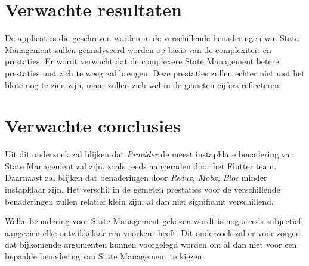 %

\section{Verwachte resultaten}
\label{sec:verwachte_resultaten}

De applicaties die geschreven worden in de verschillende benaderingen van State Management zullen
geanalyseerd worden op basis van de complexiteit en prestaties.
Er wordt verwacht dat de complexere State Management betere prestaties met zich te weeg zal brengen.
Deze prestaties zullen echter niet met het blote oog te zien zijn, maar zullen zich wel in de 
gemeten cijfers reflecteren.


\section{Verwachte conclusies}
\label{sec:verwachte_conclusies}
Uit dit onderzoek zal blijken dat \emph{Provider} de meest instapklare benadering van State Management
zal zijn, zoals reeds aangeraden door het Flutter team.
Daarnaast zal blijken dat benaderingen door \emph{Redux, Mobx, Bloc} minder instapklaar zijn.
Het verschil in de gemeten prestaties voor de verschillende benaderingen zullen relatief klein zijn, al dan niet significant verschillend.

Welke benadering voor State Management gekozen wordt is nog steeds subjectief, aangezien elke ontwikkelaar een voorkeur heeft. Dit onderzoek zal er voor zorgen
dat bijkomende argumenten kunnen voorgelegd worden om al dan niet voor een bepaalde benadering van State Management te kiezen.




